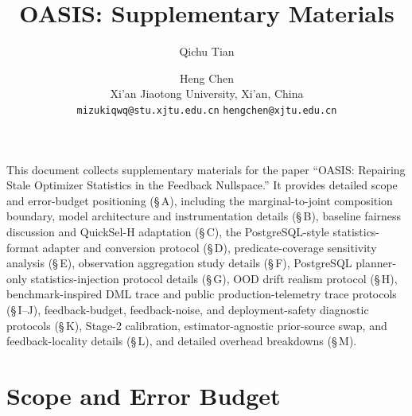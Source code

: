 \documentclass[11pt]{article}
\begin{document}
\title{OASIS: Supplementary Materials}

\author{Qichu Tian \and Heng Chen\\
  Xi'an Jiaotong University, Xi'an, China\\
  \texttt{mizukiqwq@stu.xjtu.edu.cn} \quad \texttt{hengchen@xjtu.edu.cn}}

\date{}

\maketitle

This document collects supplementary materials for the paper
``OASIS: Repairing Stale Optimizer Statistics in the Feedback Nullspace.''
It provides detailed scope and error-budget positioning (\S\,A),
including the marginal-to-joint composition boundary,
model architecture and instrumentation details (\S\,B),
baseline fairness discussion and QuickSel-H adaptation (\S\,C),
the PostgreSQL-style statistics-format adapter and conversion protocol (\S\,D),
predicate-coverage sensitivity analysis (\S\,E),
observation aggregation study details (\S\,F),
PostgreSQL planner-only statistics-injection protocol details (\S\,G),
OOD drift realism protocol (\S\,H),
benchmark-inspired DML trace and public production-telemetry trace protocols
(\S\,I--J), feedback-budget, feedback-noise, and deployment-safety diagnostic
protocols (\S\,K), Stage-2 calibration, estimator-agnostic prior-source swap,
and feedback-locality details (\S\,L), and detailed overhead breakdowns
(\S\,M).

\section{Scope and Error Budget}
\label{sec:scope-app}
\end{document}
